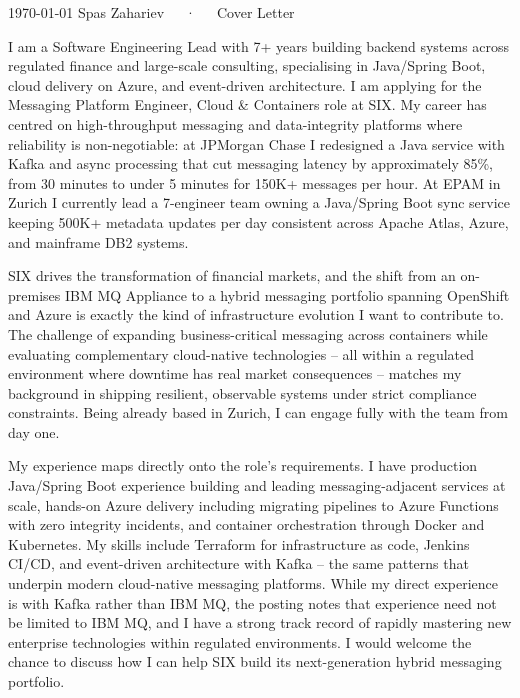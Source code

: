 \documentclass[11pt, a4paper]{awesome-cv}
\begin{document}
\makecvheader[R]

\makecvfooter
  {\today}
  {Spas Zahariev~~~·~~~Cover Letter}
  {}

\makelettertitle

\begin{cvletter}

I am a Software Engineering Lead with 7+ years building backend systems across regulated finance and large-scale consulting, specialising in Java/Spring Boot, cloud delivery on Azure, and event-driven architecture. I am applying for the Messaging Platform Engineer, Cloud \& Containers role at SIX. My career has centred on high-throughput messaging and data-integrity platforms where reliability is non-negotiable: at JPMorgan Chase I redesigned a Java service with Kafka and async processing that cut messaging latency by approximately 85\%, from 30 minutes to under 5 minutes for 150K+ messages per hour. At EPAM in Zurich I currently lead a 7-engineer team owning a Java/Spring Boot sync service keeping 500K+ metadata updates per day consistent across Apache Atlas, Azure, and mainframe DB2 systems.

SIX drives the transformation of financial markets, and the shift from an on-premises IBM MQ Appliance to a hybrid messaging portfolio spanning OpenShift and Azure is exactly the kind of infrastructure evolution I want to contribute to. The challenge of expanding business-critical messaging across containers while evaluating complementary cloud-native technologies -- all within a regulated environment where downtime has real market consequences -- matches my background in shipping resilient, observable systems under strict compliance constraints. Being already based in Zurich, I can engage fully with the team from day one.

My experience maps directly onto the role's requirements. I have production Java/Spring Boot experience building and leading messaging-adjacent services at scale, hands-on Azure delivery including migrating pipelines to Azure Functions with zero integrity incidents, and container orchestration through Docker and Kubernetes. My skills include Terraform for infrastructure as code, Jenkins CI/CD, and event-driven architecture with Kafka -- the same patterns that underpin modern cloud-native messaging platforms. While my direct experience is with Kafka rather than IBM MQ, the posting notes that experience need not be limited to IBM MQ, and I have a strong track record of rapidly mastering new enterprise technologies within regulated environments. I would welcome the chance to discuss how I can help SIX build its next-generation hybrid messaging portfolio.

\end{cvletter}


\makeletterclosing
\end{document}
